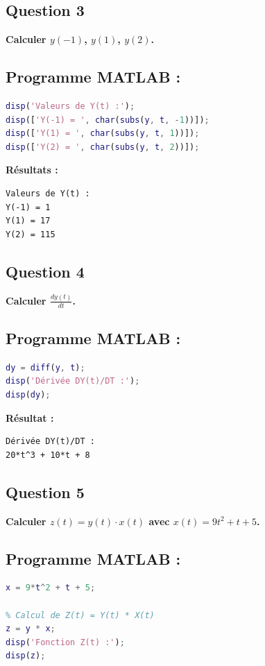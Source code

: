 \documentclass{article}
\begin{document}
\newpage
\subsection*{Question 3}
\textbf{Calculer \( y(-1) \), \( y(1) \), \( y(2) \).}

\subsection*{Programme MATLAB :}
\begin{lstlisting}[language=Matlab]
disp('Valeurs de Y(t) :');
disp(['Y(-1) = ', char(subs(y, t, -1))]);
disp(['Y(1) = ', char(subs(y, t, 1))]);
disp(['Y(2) = ', char(subs(y, t, 2))]);
\end{lstlisting}

\textbf{Résultats :}
\begin{verbatim}
Valeurs de Y(t) :
Y(-1) = 1
Y(1) = 17
Y(2) = 115
\end{verbatim}

\subsection*{Question 4}
\textbf{Calculer \( \frac{dy(t)}{dt} \).}

\subsection*{Programme MATLAB :}
\begin{lstlisting}[language=Matlab]
% Calcul de la dérivée DY(t)/DT
dy = diff(y, t);
disp('Dérivée DY(t)/DT :');
disp(dy);
\end{lstlisting}

\textbf{Résultat :}
\begin{verbatim}
Dérivée DY(t)/DT :
20*t^3 + 10*t + 8
\end{verbatim}

\newpage
\subsection*{Question 5}
\textbf{Calculer \( z(t) = y(t) \cdot x(t) \) avec \( x(t) = 9t^2 + t + 5 \).}

\subsection*{Programme MATLAB :}
\begin{lstlisting}[language=Matlab]
% Définition de X(t)
x = 9*t^2 + t + 5;

% Calcul de Z(t) = Y(t) * X(t)
z = y * x;
disp('Fonction Z(t) :');
disp(z);
\end{lstlisting}
\end{document}
